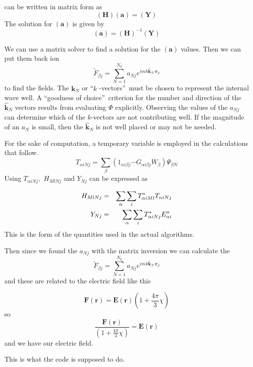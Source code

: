 \documentclass{article}
\begin{document}
can be written in matrix form as 
\begin{equation}
\left( \mathbf{H}\right) \left( \mathbf{a}\right) =\left( \mathbf{Y}\right) 
\label{HaY}
\end{equation}%
The solution for $\left( \mathbf{a}\right) $ is given by 
\begin{equation}
\left( \mathbf{a}\right) =\left( \mathbf{H}\right) ^{-1}\left( \mathbf{Y}%
\right)   \label{aHY1}
\end{equation}

We can use a matrix solver to find a solution for the $\left( \mathbf{a}%
\right) $ values. Then we can put them back ion  
\begin{equation}
\tilde{F}_{\beta j}\mathbf{=}\sum_{N=1}^{N_{k}}a_{Nj}e^{imk\mathbf{\hat{k}}%
_{N}\mathbf{\cdot r}_{\beta }}  \label{Ftilde}
\end{equation}%
to find the fields.  The $\mathbf{\hat{k}}_{N}$ or \textquotedblleft $k$%
-vectors\textquotedblright\ must be chosen to represent the internal wave
well. A \textquotedblleft goodness of choice\textquotedblright\ criterion
for the number and direction of the $\mathbf{\hat{k}}_{N}$ vectors results
from evaluating $\Phi $ explicitly. Observing the values of the $a_{Nj}$ can
determine which of the $k$-vectors are not contributing well. If the
magnitude of an $a_{N}$ is small, then the $\mathbf{\hat{k}}_{N}$ is not
well placed or may not be needed.

For the sake of computation, a temporary variable is employed in the
calculations that follow. 
\begin{equation}
T_{\alpha iNj}=\sum_{\beta }\left( 1_{\alpha i\beta j}\mathbf{-}G_{\alpha
i\beta j}W_{\beta }\right) \Psi _{\beta N}
\end{equation}
Using $T_{\alpha iNj},$ $H_{MlNj}$ and $Y_{Nj}$ can be expressed as

\begin{eqnarray}
H_{MlNj} &=&\sum_{\alpha }\sum_{i}T_{\alpha iMl}^{\ast }T_{\alpha iNj} \\
Y_{Nj} &=&\sum_{\alpha }\sum_{i}T_{\alpha iNj}^{\ast }E_{\alpha i}^{o} 
\notag
\end{eqnarray}%
This is the form of the quantities used in the actual algorithms.

Then since we found the $a_{Nj}$ with the matrix inversion we can calculate
the 
\begin{equation}
\tilde{F}_{\beta j}\mathbf{=}\sum_{N=1}^{N_{k}}a_{Nj}e^{imk\mathbf{\hat{k}}%
_{N}\mathbf{\cdot r}_{\beta }}
\end{equation}%
and these are related to the electric field like this

\begin{equation*}
\mathbf{F}(\mathbf{r})=\mathbf{E}(\mathbf{r})(1+\frac{4\pi }{3}\chi ) 
\end{equation*}%
so 
\begin{equation*}
\frac{\mathbf{F}(\mathbf{r})}{(1+\frac{4\pi }{3}\chi )}=\mathbf{E}(\mathbf{r}%
) 
\end{equation*}%
and we have our electric field.

This is what the code is supposed to do.
\end{document}
